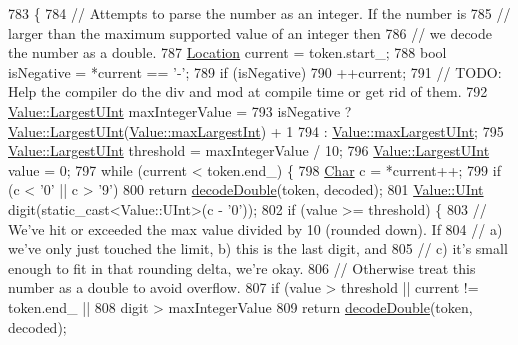 \begin{DoxyCode}
783                                                       \{
784   \textcolor{comment}{// Attempts to parse the number as an integer. If the number is}
785   \textcolor{comment}{// larger than the maximum supported value of an integer then}
786   \textcolor{comment}{// we decode the number as a double.}
787   \hyperlink{class_json_1_1_reader_a46795b5b272bf79a7730e406cb96375a}{Location} current = token.start\_;
788   \textcolor{keywordtype}{bool} isNegative = *current == \textcolor{charliteral}{'-'};
789   \textcolor{keywordflow}{if} (isNegative)
790     ++current;
791   \textcolor{comment}{// TODO: Help the compiler do the div and mod at compile time or get rid of them.}
792   \hyperlink{class_json_1_1_value_a6682a3684d635e03fc06ba229fa24eec}{Value::LargestUInt} maxIntegerValue =
793       isNegative ? \hyperlink{class_json_1_1_value_a6682a3684d635e03fc06ba229fa24eec}{Value::LargestUInt}(\hyperlink{class_json_1_1_value_a8b4977696f13296fa8755c7953fafb2f}{Value::maxLargestInt}) + 1
794                  : \hyperlink{class_json_1_1_value_a8ddb32d9d55fa5323ae5135639dc2e31}{Value::maxLargestUInt};
795   \hyperlink{class_json_1_1_value_a6682a3684d635e03fc06ba229fa24eec}{Value::LargestUInt} threshold = maxIntegerValue / 10;
796   \hyperlink{class_json_1_1_value_a6682a3684d635e03fc06ba229fa24eec}{Value::LargestUInt} value = 0;
797   \textcolor{keywordflow}{while} (current < token.end\_) \{
798     \hyperlink{class_json_1_1_reader_a3eec9118f3e9a672ba8348c3a79d0f45}{Char} c = *current++;
799     \textcolor{keywordflow}{if} (c < '0' || c > \textcolor{charliteral}{'9'})
800       \textcolor{keywordflow}{return} \hyperlink{class_json_1_1_reader_a2420bbb7fd6d5d3e7e2fea894dd8f70f}{decodeDouble}(token, decoded);
801     \hyperlink{class_json_1_1_value_a0933d59b45793ae4aade1757c322a98d}{Value::UInt} digit(static\_cast<Value::UInt>(c - \textcolor{charliteral}{'0'}));
802     \textcolor{keywordflow}{if} (value >= threshold) \{
803       \textcolor{comment}{// We've hit or exceeded the max value divided by 10 (rounded down). If}
804       \textcolor{comment}{// a) we've only just touched the limit, b) this is the last digit, and}
805       \textcolor{comment}{// c) it's small enough to fit in that rounding delta, we're okay.}
806       \textcolor{comment}{// Otherwise treat this number as a double to avoid overflow.}
807       \textcolor{keywordflow}{if} (value > threshold || current != token.end\_ ||
808           digit > maxIntegerValue %
809         \textcolor{keywordflow}{return} \hyperlink{class_json_1_1_reader_a2420bbb7fd6d5d3e7e2fea894dd8f70f}{decodeDouble}(token, decoded);

\end{DoxyCode}
